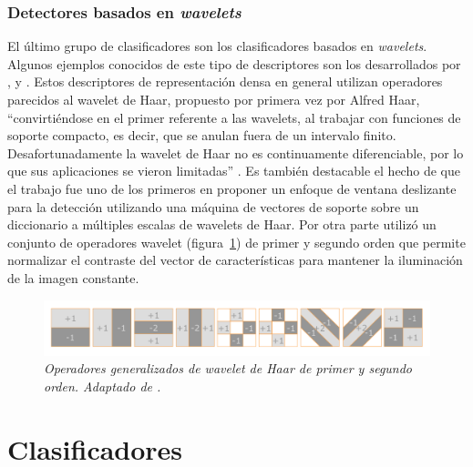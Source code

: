 \subsubsection{Detectores basados en \textit{wavelets}}

El último grupo de clasificadores son los clasificadores basados en \textit{wavelets}. Algunos ejemplos conocidos de este tipo de descriptores son los desarrollados por \cite{Papageorgiou2000}, \cite{mohan2001} y \cite{viola2001}. Estos descriptores de representación densa en general utilizan operadores parecidos al wavelet de Haar,  propuesto por primera vez por Alfred Haar, ``convirtiéndose en el primer referente a las wavelets, al trabajar con funciones de soporte compacto, es decir, que se anulan fuera de un intervalo finito. Desafortunadamente la wavelet de Haar no es continuamente diferenciable, por lo que sus aplicaciones se vieron limitadas'' \citep{FernandezSarria2007a}. Es también destacable el hecho de que el trabajo \cite{Papageorgiou2000} fue uno de los primeros en proponer un enfoque de ventana deslizante para la detección utilizando una máquina de vectores de soporte sobre un diccionario a múltiples escalas de wavelets de Haar. Por otra parte \cite{dalal2006} utilizó un conjunto de operadores wavelet (figura~\ref{fig:wavelets}) de primer y segundo orden que permite normalizar el contraste del vector de características para mantener la iluminación de la imagen constante.

\begin{figure}[htc]
  \centering
  \includegraphics[scale=.3]{images/wavelets}
  \caption{\em Operadores generalizados de wavelet de Haar de primer y segundo orden. Adaptado de \cite{dalal2006}.}  
  \label{fig:wavelets}
\end{figure}

\section{Clasificadores}
\label{preliminares:clasif}

